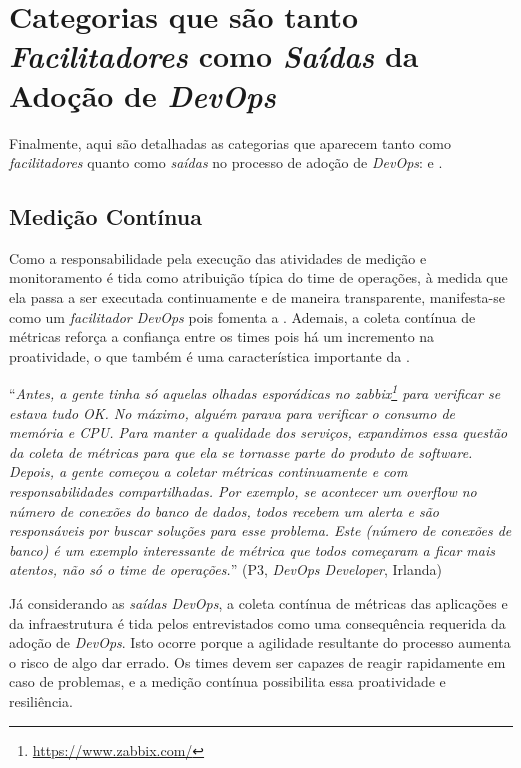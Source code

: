 \section{Categorias que são tanto \emph{Facilitadores} como \emph{Saídas} da Adoção de \emph{DevOps}}\label{secao_facilitadores_e_saidas}

Finalmente, aqui são detalhadas as categorias que aparecem tanto como
\emph{facilitadores} quanto como \emph{saídas} no processo de adoção de
{\it DevOps}:  e .


\subsection{Medição Contínua}

Como a responsabilidade pela execução das atividades de medição e monitoramento
é tida como atribuição típica do time de operações, à medida que ela passa a
ser executada continuamente e de maneira transparente, manifesta-se como um
\emph{facilitador DevOps} pois fomenta a \cc. Ademais, a coleta
contínua de métricas reforça a confiança entre os times pois há um incremento
na proatividade, o que também é uma característica importante da \cc.

\begin{mq}
``\emph{Antes, a gente tinha só aquelas olhadas esporádicas no zabbix\footnote{\url{https://www.zabbix.com/}}
para verificar se estava tudo OK. No máximo, alguém parava para verificar o
consumo de memória e CPU. Para manter a qualidade dos serviços, expandimos essa
questão da coleta de métricas para que ela se tornasse parte do produto de
software. Depois, a gente começou a coletar métricas continuamente e com
responsabilidades compartilhadas. Por exemplo, se acontecer um overflow no
número de conexões do banco de dados, todos recebem um alerta e são responsáveis
por buscar soluções para esse problema. Este (número de conexões de banco) é um
exemplo interessante de métrica que todos começaram a ficar mais atentos, não
só o time de operações.}''
(P3, {\it DevOps Developer}, Irlanda)
\end{mq}

Já considerando as \emph{saídas DevOps}, a coleta contínua de métricas das
aplicações e da infraestrutura é tida pelos entrevistados como uma consequência
requerida da adoção de {\it DevOps}. Isto ocorre porque a agilidade resultante
do processo aumenta o risco de algo dar errado. Os times devem ser capazes de
reagir rapidamente em caso de problemas, e a medição contínua possibilita essa
proatividade e resiliência.


